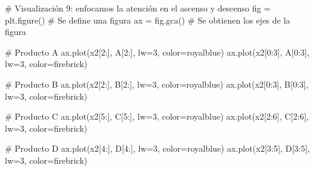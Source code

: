 \documentclass[
  letterpaper,
  DIV=11,
  numbers=noendperiod]{scrreprt}
\newenvironment{Shaded}{\begin{snugshade}}{\end{snugshade}}
\newcommand{\CommentTok}[1]{\textcolor[rgb]{0.37,0.37,0.37}{#1}}
\newcommand{\DecValTok}[1]{\textcolor[rgb]{0.68,0.00,0.00}{#1}}
\newcommand{\NormalTok}[1]{\textcolor[rgb]{0.00,0.23,0.31}{#1}}
\newcommand{\OperatorTok}[1]{\textcolor[rgb]{0.37,0.37,0.37}{#1}}
\newcommand{\StringTok}[1]{\textcolor[rgb]{0.13,0.47,0.30}{#1}}
\begin{document}
\begin{Shaded}
\begin{Highlighting}[]
\CommentTok{\# Visualización 9: enfocamos la atención en el ascenso y descenso}
\NormalTok{fig }\OperatorTok{=}\NormalTok{ plt.figure() }\CommentTok{\# Se define una figura}
\NormalTok{ax }\OperatorTok{=}\NormalTok{ fig.gca()     }\CommentTok{\# Se obtienen los ejes de la figura}

\CommentTok{\# Producto A}
\NormalTok{ax.plot(x2[}\DecValTok{2}\NormalTok{:], A[}\DecValTok{2}\NormalTok{:], lw}\OperatorTok{=}\DecValTok{3}\NormalTok{, color}\OperatorTok{=}\StringTok{\textquotesingle{}royalblue\textquotesingle{}}\NormalTok{)}
\NormalTok{ax.plot(x2[}\DecValTok{0}\NormalTok{:}\DecValTok{3}\NormalTok{], A[}\DecValTok{0}\NormalTok{:}\DecValTok{3}\NormalTok{], lw}\OperatorTok{=}\DecValTok{3}\NormalTok{, color}\OperatorTok{=}\StringTok{\textquotesingle{}firebrick\textquotesingle{}}\NormalTok{)}

\CommentTok{\# Producto B}
\NormalTok{ax.plot(x2[}\DecValTok{2}\NormalTok{:], B[}\DecValTok{2}\NormalTok{:], lw}\OperatorTok{=}\DecValTok{3}\NormalTok{, color}\OperatorTok{=}\StringTok{\textquotesingle{}royalblue\textquotesingle{}}\NormalTok{)}
\NormalTok{ax.plot(x2[}\DecValTok{0}\NormalTok{:}\DecValTok{3}\NormalTok{], B[}\DecValTok{0}\NormalTok{:}\DecValTok{3}\NormalTok{], lw}\OperatorTok{=}\DecValTok{3}\NormalTok{, color}\OperatorTok{=}\StringTok{\textquotesingle{}firebrick\textquotesingle{}}\NormalTok{)}

\CommentTok{\# Producto C}
\NormalTok{ax.plot(x2[}\DecValTok{5}\NormalTok{:], C[}\DecValTok{5}\NormalTok{:], lw}\OperatorTok{=}\DecValTok{3}\NormalTok{, color}\OperatorTok{=}\StringTok{\textquotesingle{}royalblue\textquotesingle{}}\NormalTok{)}
\NormalTok{ax.plot(x2[}\DecValTok{2}\NormalTok{:}\DecValTok{6}\NormalTok{], C[}\DecValTok{2}\NormalTok{:}\DecValTok{6}\NormalTok{], lw}\OperatorTok{=}\DecValTok{3}\NormalTok{, color}\OperatorTok{=}\StringTok{\textquotesingle{}firebrick\textquotesingle{}}\NormalTok{)}

\CommentTok{\# Producto D}
\NormalTok{ax.plot(x2[}\DecValTok{4}\NormalTok{:], D[}\DecValTok{4}\NormalTok{:], lw}\OperatorTok{=}\DecValTok{3}\NormalTok{, color}\OperatorTok{=}\StringTok{\textquotesingle{}royalblue\textquotesingle{}}\NormalTok{)}
\NormalTok{ax.plot(x2[}\DecValTok{3}\NormalTok{:}\DecValTok{5}\NormalTok{], D[}\DecValTok{3}\NormalTok{:}\DecValTok{5}\NormalTok{], lw}\OperatorTok{=}\DecValTok{3}\NormalTok{, color}\OperatorTok{=}\StringTok{\textquotesingle{}firebrick\textquotesingle{}}\NormalTok{)}


\end{Highlighting}
\end{Shaded}
\end{document}
